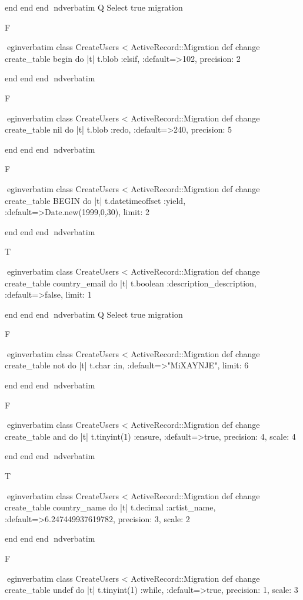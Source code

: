     end 
  end 
end
nd{verbatim}
Q
 Select true migration

F

egin{verbatim}
 class CreateUsers < ActiveRecord::Migration 
  def change 
    create_table begin do |t| 
      t.blob :elsif, :default=>102, precision: 2
    
    end 
  end 
end
nd{verbatim}

F

egin{verbatim}
 class CreateUsers < ActiveRecord::Migration 
  def change 
    create_table nil do |t| 
      t.blob :redo, :default=>240, precision: 5
    
    end 
  end 
end
nd{verbatim}

F

egin{verbatim}
 class CreateUsers < ActiveRecord::Migration 
  def change 
    create_table BEGIN do |t| 
      t.datetimeoffset :yield, :default=>Date.new(1999,0,30), limit: 2
    
    end 
  end 
end
nd{verbatim}

T

egin{verbatim}
 class CreateUsers < ActiveRecord::Migration 
  def change 
    create_table country_email do |t| 
      t.boolean :description_description, :default=>false, limit: 1
    
    end 
  end 
end
nd{verbatim}
Q
 Select true migration

F

egin{verbatim}
 class CreateUsers < ActiveRecord::Migration 
  def change 
    create_table not do |t| 
      t.char :in, :default=>"MiXAYNJE", limit: 6
    
    end 
  end 
end
nd{verbatim}

F

egin{verbatim}
 class CreateUsers < ActiveRecord::Migration 
  def change 
    create_table and do |t| 
      t.tinyint(1) :ensure, :default=>true, precision: 4, scale: 4
    
    end 
  end 
end
nd{verbatim}

T

egin{verbatim}
 class CreateUsers < ActiveRecord::Migration 
  def change 
    create_table country_name do |t| 
      t.decimal :artist_name, :default=>6.247449937619782, precision: 3, scale: 2
    
    end 
  end 
end
nd{verbatim}

F

egin{verbatim}
 class CreateUsers < ActiveRecord::Migration 
  def change 
    create_table undef do |t| 
      t.tinyint(1) :while, :default=>true, precision: 1, scale: 3
    
